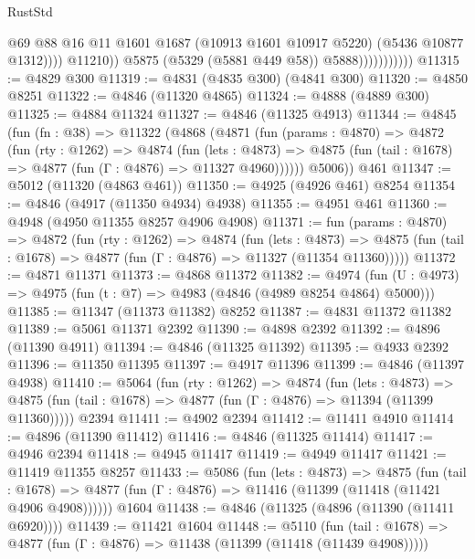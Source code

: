 \begin{lexlean}{RustStd}
\begin{coremodule}
                                    @69
                                    @88
                                    @16
                                    @11
                                    @1601
                                    @1687
                                    (@10913 @1601 @10917 @5220)
                                    (@5436 @10877 @1312))))
                              @11210))
                          @5875
                          (@5329 (@5881 @449 @58))
                          @5888)))))))))))
@11315 := @4829 @300
@11319 := @4831 (@4835 @300) (@4841 @300)
@11320 := @4850 @8251
@11322 := @4846 (@11320 @4865)
@11324 := @4888 (@4889 @300)
@11325 := @4884 @11324
@11327 := @4846 (@11325 @4913)
@11344 := @4845
    (fun (fn : @38) =>
    @11322
      (@4868
        (@4871
          (fun (params : @4870) =>
          @4872
            (fun (rty : @1262) =>
            @4874
              (fun (lets : @4873) =>
              @4875 (fun (tail : @1678) => @4877 (fun (Γ : @4876) => @11327 @4960))))))
        @5006))
    @461
@11347 := @5012 (@11320 (@4863 @461))
@11350 := @4925 (@4926 @461) @8254
@11354 := @4846 (@4917 (@11350 @4934) @4938)
@11355 := @4951 @461
@11360 := @4948 (@4950 @11355 @8257 @4906 @4908)
@11371 := fun (params : @4870) =>
  @4872
    (fun (rty : @1262) =>
    @4874
      (fun (lets : @4873) =>
      @4875 (fun (tail : @1678) => @4877 (fun (Γ : @4876) => @11327 (@11354 @11360)))))
@11372 := @4871 @11371
@11373 := @4868 @11372
@11382 := @4974 (fun (U : @4973) => @4975 (fun (t : @7) => @4983 (@4846 (@4989 @8254 @4864) @5000)))
@11385 := @11347 (@11373 @11382) @8252
@11387 := @4831 @11372 @11382
@11389 := @5061 @11371 @2392
@11390 := @4898 @2392
@11392 := @4896 (@11390 @4911)
@11394 := @4846 (@11325 @11392)
@11395 := @4933 @2392
@11396 := @11350 @11395
@11397 := @4917 @11396
@11399 := @4846 (@11397 @4938)
@11410 := @5064
    (fun (rty : @1262) =>
    @4874
      (fun (lets : @4873) =>
      @4875 (fun (tail : @1678) => @4877 (fun (Γ : @4876) => @11394 (@11399 @11360)))))
    @2394
@11411 := @4902 @2394
@11412 := @11411 @4910
@11414 := @4896 (@11390 @11412)
@11416 := @4846 (@11325 @11414)
@11417 := @4946 @2394
@11418 := @4945 @11417
@11419 := @4949 @11417
@11421 := @11419 @11355 @8257
@11433 := @5086
    (fun (lets : @4873) =>
    @4875
      (fun (tail : @1678) =>
      @4877 (fun (Γ : @4876) => @11416 (@11399 (@11418 (@11421 @4906 @4908))))))
    @1604
@11438 := @4846 (@11325 (@4896 (@11390 (@11411 @6920))))
@11439 := @11421 @1604
@11448 := @5110
    (fun (tail : @1678) => @4877 (fun (Γ : @4876) => @11438 (@11399 (@11418 (@11439 @4908)))))

\end{coremodule}
\end{lexlean}
